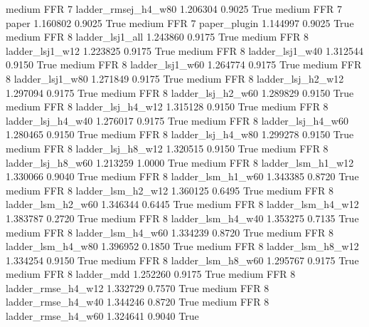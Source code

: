     medium      FFR                 7 ladder_rmsej_h4_w80   1.206304      0.9025    True
    medium      FFR                 7               paper   1.160802      0.9025    True
    medium      FFR                 7        paper_plugin   1.144997      0.9025    True
    medium      FFR                 8     ladder_lsj1_all   1.243860      0.9175    True
    medium      FFR                 8     ladder_lsj1_w12   1.223825      0.9175    True
    medium      FFR                 8     ladder_lsj1_w40   1.312544      0.9150    True
    medium      FFR                 8     ladder_lsj1_w60   1.264774      0.9175    True
    medium      FFR                 8     ladder_lsj1_w80   1.271849      0.9175    True
    medium      FFR                 8   ladder_lsj_h2_w12   1.297094      0.9175    True
    medium      FFR                 8   ladder_lsj_h2_w60   1.289829      0.9150    True
    medium      FFR                 8   ladder_lsj_h4_w12   1.315128      0.9150    True
    medium      FFR                 8   ladder_lsj_h4_w40   1.276017      0.9175    True
    medium      FFR                 8   ladder_lsj_h4_w60   1.280465      0.9150    True
    medium      FFR                 8   ladder_lsj_h4_w80   1.299278      0.9150    True
    medium      FFR                 8   ladder_lsj_h8_w12   1.320515      0.9150    True
    medium      FFR                 8   ladder_lsj_h8_w60   1.213259      1.0000    True
    medium      FFR                 8   ladder_lsm_h1_w12   1.330066      0.9040    True
    medium      FFR                 8   ladder_lsm_h1_w60   1.343385      0.8720    True
    medium      FFR                 8   ladder_lsm_h2_w12   1.360125      0.6495    True
    medium      FFR                 8   ladder_lsm_h2_w60   1.346344      0.6445    True
    medium      FFR                 8   ladder_lsm_h4_w12   1.383787      0.2720    True
    medium      FFR                 8   ladder_lsm_h4_w40   1.353275      0.7135    True
    medium      FFR                 8   ladder_lsm_h4_w60   1.334239      0.8720    True
    medium      FFR                 8   ladder_lsm_h4_w80   1.396952      0.1850    True
    medium      FFR                 8   ladder_lsm_h8_w12   1.334254      0.9150    True
    medium      FFR                 8   ladder_lsm_h8_w60   1.295767      0.9175    True
    medium      FFR                 8          ladder_mdd   1.252260      0.9175    True
    medium      FFR                 8  ladder_rmse_h4_w12   1.332729      0.7570    True
    medium      FFR                 8  ladder_rmse_h4_w40   1.344246      0.8720    True
    medium      FFR                 8  ladder_rmse_h4_w60   1.324641      0.9040    True
